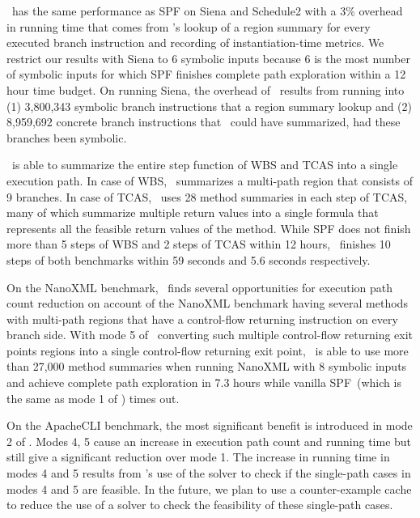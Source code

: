 \tool\ has the same performance as SPF on Siena and Schedule2 with a 3\% overhead in running time that comes from
\tool\rq s lookup of a region summary for every executed branch instruction and recording of instantiation-time metrics.
%
We restrict our results with Siena to 6 symbolic inputs because 6 is the most number of symbolic inputs for which
SPF finishes complete path exploration within a 12 hour time budget.
%
On running Siena, the overhead of \tool\ results from running into (1) 3,800,343 symbolic branch
instructions that a region summary lookup and (2) 8,959,692 concrete branch instructions that
\tool\ could have summarized, had these branches been symbolic.

\tool\ is able to summarize the entire step function of WBS and TCAS into a single execution path.
%
In case of WBS, \tool\ summarizes a multi-path region that consists of 9 branches.
%
In case of TCAS, \tool\ uses 28 method summaries in each step of TCAS, many of which summarize multiple return values
into a single formula that represents all the feasible return values of the method.
%
While SPF does not finish more than 5 steps of WBS and 2 steps of TCAS within 12 hours, \tool\ finishes 10 steps of both
benchmarks within 59 seconds and 5.6 seconds respectively.

On the NanoXML benchmark, \tool\ finds several opportunities for execution path count reduction on account of the
NanoXML benchmark having several methods with multi-path regions that have a control-flow returning instruction on every
branch side.
%
With mode 5 of \tool\ converting such multiple control-flow returning exit points regions into a single control-flow
returning exit point, \tool\ is able to use more than 27,000 method summaries when running NanoXML with 8 symbolic
inputs and achieve complete path exploration in 7.3 hours while vanilla SPF~(which is the same as mode 1 of \tool)
times out.

On the ApacheCLI benchmark, the most significant benefit is introduced in mode 2 of \tool.
%
Modes 4, 5 cause an increase in execution path count and running time but still give a significant reduction over
mode 1.
%
The increase in running time in modes 4 and 5 results from \tool\rq s use of the solver to check if the single-path cases
in modes 4 and 5 are feasible.
%
In the future, we plan to use a counter-example cache to reduce the use of a solver to check the feasibility of these
single-path cases.


